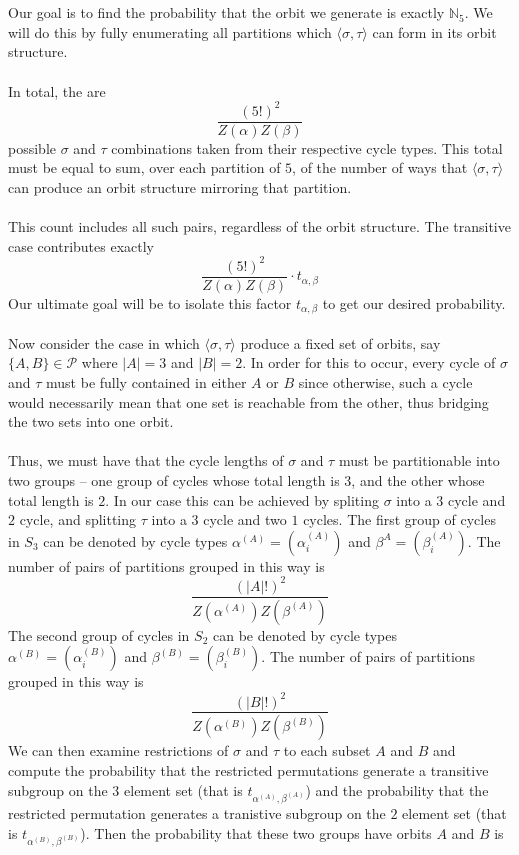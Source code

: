 \\\\Our goal is to find the probability that the orbit we generate is exactly $\mathbb{N}_5$. We will do this by fully enumerating all partitions which $\langle \sigma, \tau \rangle$ can form in its orbit structure.
	\\\\In total, the are
	\[
		\frac{(5!)^2}{Z(\alpha)Z(\beta)}
	\]
	possible $\sigma$ and $\tau$ combinations taken from their respective cycle types. This total must be equal to sum, over each partition of $5$, of the number of ways that  $\langle \sigma, \tau \rangle$ can produce an orbit structure mirroring that partition.
	\\\\This count includes all such pairs, regardless of the orbit structure. The transitive case contributes exactly
	\[
		\frac{(5!)^2}{Z(\alpha)Z(\beta)}\cdot t_{\alpha, \beta}
	\]
    Our ultimate goal will be to isolate this factor $t_{\alpha, \beta}$ to get our desired probability. 
	\\\\Now consider the case in which $\langle \sigma, \tau \rangle$ produce a fixed set of orbits, say $\{A,B\}\in\mathcal{P}$ where $|A| = 3$ and $|B| = 2$. In order for this to occur, every cycle of $\sigma$ and $\tau$ must be fully contained in either $A$ or $B$ since otherwise, such a cycle would necessarily mean that one set is reachable from the other, thus bridging the two sets into one orbit.
	\\\\Thus, we must have that the cycle lengths of $\sigma$ and $\tau$ must be partitionable into two groups -- one group of cycles whose total length is $3$, and the other whose total length is $2$. In our case this can be achieved by spliting $\sigma$ into a $3$ cycle and $2$ cycle, and splitting $\tau$ into a $3$ cycle and two $1$ cycles. The first group of cycles in $S_3$ can be denoted by cycle types $\alpha^{(A)} = (\alpha^{(A)}_{i})$ and $\beta^{A} = (\beta^{(A)}_{i})$. The number of pairs of partitions grouped in this way is
	\[
		\frac{(|A|!)^2}{Z(\alpha^{(A)})Z(\beta^{(A)})}
	\]
	The second group of cycles in $S_2$ can be denoted by cycle types $\alpha^{(B)} = (\alpha^{(B)}_i)$ and $\beta^{(B)} = (\beta_{i}^{(B)})$. The number of pairs of partitions grouped in this way is
	\[
		\frac{(|B|!)^2}{Z(\alpha^{(B)})Z(\beta^{(B)})}
	\]
	We can then examine restrictions of $\sigma$ and $\tau$ to each subset $A$ and $B$ and compute the probability that the restricted permutations generate a transitive subgroup on the $3$ element set (that is $t_{\alpha^{(A)},\beta^{(A)}}$) and the probability that the restricted permutation generates a tranistive subgroup on the $2$ element set (that is $t_{\alpha^{(B)},\beta^{(B)}}$). Then the probability that these two groups have orbits $A$ and $B$ is
